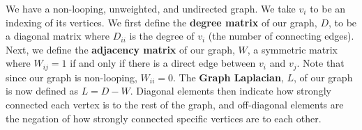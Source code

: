 We have a non-looping, unweighted, and undirected graph. We take $v_i$ to be an indexing of its vertices.
We first define the \textbf{degree matrix} of our graph, $D$, to be a diagonal matrix where $D_{ii}$ is the degree of $v_i$ (the number of connecting edges).
Next, we define the \textbf{adjacency matrix} of our graph, $W$, a symmetric matrix where $W_{ij}=1$ if and only if there is a direct edge between $v_i$ and $v_j$. Note that since our graph is non-looping, $W_{ii}=0$.
The \textbf{Graph Laplacian}, $L$, of our graph is now defined as $L=D-W$. Diagonal elements then indicate how strongly connected each vertex is to the rest of the graph, and off-diagonal elements are the negation of how strongly connected specific vertices are to each other.